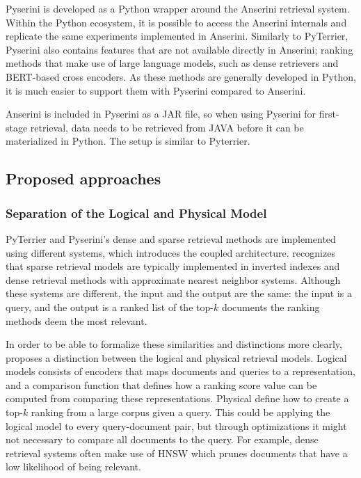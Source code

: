 Pyserini is developed as a Python wrapper around the Anserini retrieval system. Within the Python ecosystem, it is possible to access the Anserini internals and replicate the same experiments implemented in Anserini. Similarly to PyTerrier, Pyserini also contains features that are not available directly in Anserini; ranking methods that make use of large language models, such as dense retrievers and BERT-based cross encoders. As these methods are generally developed in Python, it is much easier to support them with Pyserini compared to Anserini.

Anserini is included in Pyserini as a JAR file, so when using Pyserini for first-stage retrieval, data needs to be retrieved from JAVA before it can be materialized in Python. The setup is similar to Pyterrier. 

\subsection{Proposed approaches}
\subsubsection{Separation of the Logical and Physical Model}
PyTerrier and Pyserini's dense and sparse retrieval methods are implemented using different systems, which introduces the coupled architecture. \citet{seperation-logical-physical} recognizes that sparse retrieval models are typically implemented in inverted indexes and dense retrieval methods with approximate nearest neighbor systems. Although these systems are different, the input and the output are the same: the input is a query, and the output is a ranked list of the top-$k$ documents the ranking methods deem the most relevant. 

In order to be able to formalize these similarities and distinctions more clearly, \citeauthor{seperation-logical-physical} proposes a distinction between the logical and physical retrieval models. Logical models consists of encoders that maps documents and queries to a representation, and a comparison function that defines how a ranking score value can be computed from comparing these representations. Physical define how to create a top-$k$ ranking from a large corpus given a query. This could be applying the logical model to every query-document pair, but through optimizations it might not necessary to compare all documents to the query. For example, dense retrieval systems often make use of HNSW which prunes documents that have a low likelihood of being relevant. 

